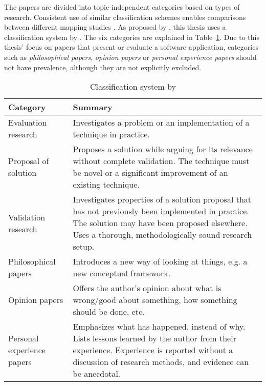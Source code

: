 \documentclass[utf8,english]{gradu3}
\begin{document}
The papers are divided into topic-independent categories based on types of research.
Consistent use of similar classification schemes
enables comparisons between different mapping studies \parencite{petersen2015guidelines}.
As proposed by \textcite{petersen2008}, this thesis uses a classification system by \textcite{wieringa2006requirements}.
The six categories are explained in Table~\ref{classes}. Due to this thesis' focus on papers that present or evaluate a
software application, categories such as \textit{philosophical papers}, \textit{opinion papers} or
\textit{personal experience papers} should not have prevalence, although they are not explicitly excluded.

\begin{table}[h]
  \centering
  \begin{tabular}{|p{3.5cm}|p{9cm}|}
    \hline
    \textbf{Category}          & \textbf{Summary}                                                                                                                                                                                            \\ \hline
    Evaluation research        & Investigates a problem or an implementation of a technique in practice.                                                                                                                                     \\ \hline
    Proposal of solution       & Proposes a solution while arguing for its relevance without complete validation. The technique must be novel or a significant improvement of an existing technique.                                         \\ \hline
    Validation research        & Investigates properties of a solution proposal that has not previously been implemented in practice. The solution may have been proposed elsewhere. Uses a thorough, methodologically sound research setup. \\ \hline
    Philosophical papers       & Introduces a new way of looking at things, e.g. a new conceptual framework.                                                                                                                                 \\ \hline
    Opinion papers             & Offers the author's opinion about what is wrong/good about something, how something should be done, etc.                                                                                                    \\ \hline
    Personal experience papers & Emphasizes what has happened, instead of why. Lists lessons learned by the author from their experience. Experience is reported without a discussion of research methods, and evidence can be anecdotal.    \\ \hline
  \end{tabular}
  \caption{Classification system by \textcite{wieringa2006requirements}}
  \label{classes}
\end{table}
\end{document}
